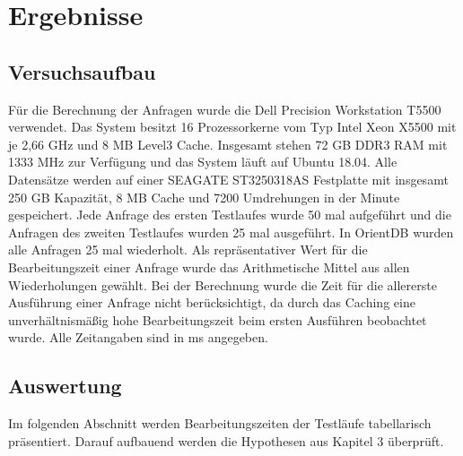 
\chapter{Ergebnisse} %

\label{Kaptiel4} %

\section{Versuchsaufbau}
Für die Berechnung der Anfragen wurde die Dell Precision Workstation T5500 verwendet. Das System besitzt 16 Prozessorkerne vom Typ Intel Xeon  X5500 mit je 2,66 GHz und  8 MB Level3 Cache. Insgesamt stehen 72 GB DDR3 RAM mit 1333 MHz zur Verfügung und das System läuft auf Ubuntu 18.04. Alle Datensätze werden auf einer SEAGATE ST3250318AS Festplatte mit insgesamt 250 GB Kapazität, 8 MB Cache und 7200 Umdrehungen in der Minute gespeichert.\newline
 Jede Anfrage des ersten Testlaufes wurde 50 mal aufgeführt und die Anfragen des zweiten Testlaufes wurden 25 mal ausgeführt. In OrientDB wurden alle Anfragen 25 mal wiederholt. Als repräsentativer Wert für die Bearbeitungszeit einer Anfrage  wurde das Arithmetische Mittel aus allen Wiederholungen gewählt. Bei der Berechnung wurde die Zeit für die allererste Ausführung einer Anfrage nicht berücksichtigt, da durch das Caching eine unverhältnismäßig hohe Bearbeitungszeit beim ersten Ausführen beobachtet wurde. Alle Zeitangaben sind in ms angegeben. 
\section{Auswertung}
Im folgenden Abschnitt werden Bearbeitungszeiten der Testläufe tabellarisch präsentiert.  Darauf aufbauend werden die Hypothesen aus Kapitel 3 überprüft.  
